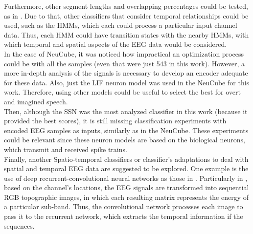 Furthermore, other segment lengths and overlapping percentages could be tested, as in \cite{marek}. Due to that, other classifiers that consider temporal relationships could be used, such as the HMMs, which each could process a particular input channel data. Thus, each HMM could have transition states with the nearby HMMs, with which temporal and spatial aspects of the EEG data would be considered.\\

In the case of NeuCube, it was noticed how impractical an optimization process could be with all the samples (even that were just 543 in this work). However, a more in-depth analysis of the signals is necessary to develop an encoder adequate for these data. Also, just the LIF neuron model was used in the NeuCube for this work. Therefore, using other models could be useful to select the best for overt and imagined speech.\\

Then, although the SSN was the most analyzed classifier in this work (because it provided the best scores), it is still missing classification experiments with encoded EEG samples as inputs, similarly as in the NeuCube. These experiments could be relevant since these neuron models are based on the biological neurons, which transmit and received spike trains.\\

Finally, another Spatio-temporal classifiers or classifier's adaptations to deal with spatial and temporal EEG data are suggested to be explored. One example is the use of deep recurrent-convolutional neural networks as those in \cite{bashivan2015learning, tan2017multimodal, hajinoroozi2017deep}. Particularly in \cite{bashivan2015learning}, based on the channel's locations, the EEG signals are transformed into sequential RGB topographic images, in which each resulting matrix represents the energy of a particular sub-band. Thus, the convolutional network processes each image to pass it to the recurrent network, which extracts the temporal information if the sequences.
